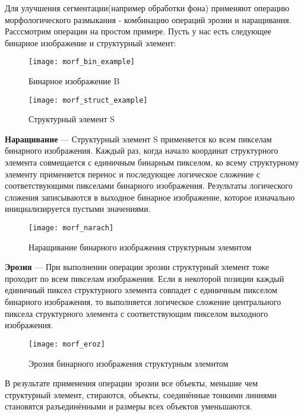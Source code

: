 Для улучшения сегментации(например обработки фона) применяют операцию морфологического размыкания - комбинацию операций эрозии и наращивания. Расссмотрим операции на простом примере. Пусть у нас есть следующее бинарное изображение и структурный элемент:
\begin{figure}[H]
	\texttt{[image: morf\_bin\_example]}
	\caption{Бинарное изображение B}\label{morf_bin_example}
	\endminipage\hfill
	\texttt{[image: morf\_struct\_example]}
	\caption{Структурный элемент S}\label{morf_struct_example}
	\endminipage\hfill
\end{figure}

	\textbf{Наращивание} — Структурный элемент S применяется ко всем пикселам бинарного изображения. Каждый раз, когда начало координат структурного элемента совмещается с единичным бинарным пикселом, ко всему структурному элементу применяется перенос и последующее логическое сложение с соответствующими пикселами бинарного изображения. Результаты логического сложения записываются в выходное бинарное изображение, которое изначально инициализируется пустыми значениями.
	
	\begin{figure}[H]
		\centering
		\texttt{[image: morf\_narach]}
		\caption{Наращивание бинарного изображения структурным элемнтом}
		\label{morf_narach}
	\end{figure}
	
	\textbf{Эрозия} — При выполнении операции эрозии структурный элемент тоже проходит по всем пикселам изображения. Если в некоторой позиции каждый единичный пиксел структурного элемента совпадет с единичным пикселом бинарного изображения, то выполняется логическое сложение центрального пиксела структурного элемента с соответствующим пикселом выходного изображения.
	
	\begin{figure}[H]
		\centering
		\texttt{[image: morf\_eroz]}
		\caption{Эрозия бинарного изображения структурным элемнтом}
		\label{morf_eroz}
	\end{figure}
	В результате применения операции эрозии все объекты, меньшие чем структурный элемент, стираются, объекты, соединённые тонкими линиями становятся разъединёнными и размеры всех объектов уменьшаются.
	
